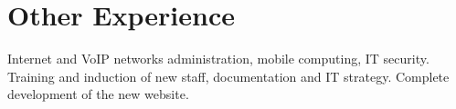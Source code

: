 \section{Other Experience}
{Internet and VoIP networks administration, mobile computing, IT security. Training and induction of new staff, documentation and IT strategy. Complete development of the new website.}
